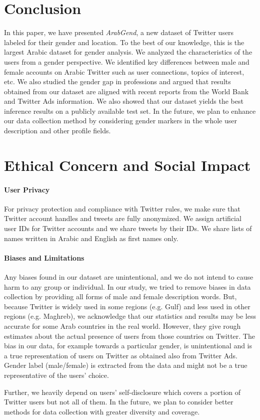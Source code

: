 \documentclass[sigconf,authorversion,nonacm]{acmart}
\begin{document}
\section{Conclusion}
\label{sec:conclusion}
In this paper, we have presented \textit{ArabGend}, a new dataset of Twitter users labeled for their gender and location. To the best of our knowledge, this is the largest Arabic dataset for gender analysis. We analyzed the characteristics of the users from a gender perspective. We identified key differences between male and female accounts on Arabic Twitter such as user connections, topics of interest, etc. We also studied the gender gap in professions and argued that results obtained from our dataset are aligned with recent reports from the World Bank and Twitter Ads information. We also showed that our dataset yields the best inference results on a publicly available test set. In the future, we plan to enhance our data collection method by considering gender markers in the whole user description and other profile fields.

\section*{Ethical Concern and Social Impact}
\paragraph{\textbf{User Privacy}}
For privacy protection and compliance with Twitter rules, we make sure that Twitter account handles and tweets are fully anonymized. We assign artificial user IDs for Twitter accounts %
and we share tweets by their IDs. We share lists of names written in Arabic and English as first names only. 
\paragraph{\textbf{Biases and Limitations}}
Any biases found in our dataset are unintentional, and we do not intend to cause harm to any group or individual. In our study, we tried to remove biases in data collection by providing all forms of male and female description words. But, because Twitter is widely used in some regions (e.g. Gulf) and less used in other regions (e.g. Maghreb), we acknowledge that our statistics and results may be less accurate for some Arab countries in the real world. However, they give rough estimates about the actual presence of users from those countries on Twitter. The bias in our data, for example towards a particular gender, is unintentional and is a true representation of users on Twitter as obtained also from Twitter Ads. Gender label (male/female) is extracted from the data and might not be a true representative of the users' choice.

Further, we heavily depend on users' self-disclosure which covers a portion of Twitter users but not all of them. In the future, we plan to consider better methods for data collection with greater diversity and coverage.




\end{document}
